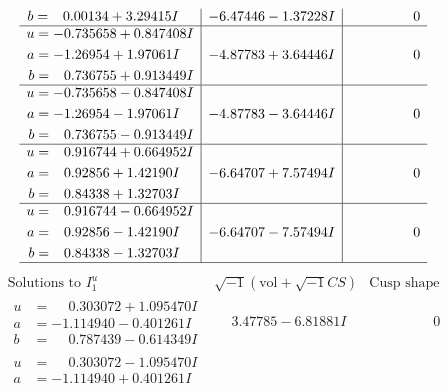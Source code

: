 \documentclass[1p]{elsarticle_modified}
\theoremstyle{definition}
\newcommand{\I}{\sqrt{-1}}
\begin{document}
$$\begin{array}{c|c|c}
\begin{aligned}
b &= \phantom{-}0.00134 + 3.29415 I\end{aligned}
 & -6.47446 - 1.37228 I & \phantom{-0.000000 } 0 \\ \hline\begin{aligned}
u &= -0.735658 + 0.847408 I \\
a &= -1.26954 + 1.97061 I \\
b &= \phantom{-}0.736755 + 0.913449 I\end{aligned}
 & -4.87783 + 3.64446 I & \phantom{-0.000000 } 0 \\ \hline\begin{aligned}
u &= -0.735658 - 0.847408 I \\
a &= -1.26954 - 1.97061 I \\
b &= \phantom{-}0.736755 - 0.913449 I\end{aligned}
 & -4.87783 - 3.64446 I & \phantom{-0.000000 } 0 \\ \hline\begin{aligned}
u &= \phantom{-}0.916744 + 0.664952 I \\
a &= \phantom{-}0.92856 + 1.42190 I \\
b &= \phantom{-}0.84338 + 1.32703 I\end{aligned}
 & -6.64707 + 7.57494 I & \phantom{-0.000000 } 0 \\ \hline\begin{aligned}
u &= \phantom{-}0.916744 - 0.664952 I \\
a &= \phantom{-}0.92856 - 1.42190 I \\
b &= \phantom{-}0.84338 - 1.32703 I\end{aligned}
 & -6.64707 - 7.57494 I & \phantom{-0.000000 } 0\\
 \hline 
 \end{array}$$\newpage$$\begin{array}{c|c|c}  
\text{Solutions to }I^u_{1}& \I (\text{vol} + \sqrt{-1}CS) & \text{Cusp shape}\\
 \hline 
\begin{aligned}
u &= \phantom{-}0.303072 + 1.095470 I \\
a &= -1.114940 - 0.401261 I \\
b &= \phantom{-}0.787439 - 0.614349 I\end{aligned}
 & \phantom{-}3.47785 - 6.81881 I & \phantom{-0.000000 } 0 \\ \hline\begin{aligned}
u &= \phantom{-}0.303072 - 1.095470 I \\
a &= -1.114940 + 0.401261 I \\

\end{aligned}
\end{array}$$
\end{document}
